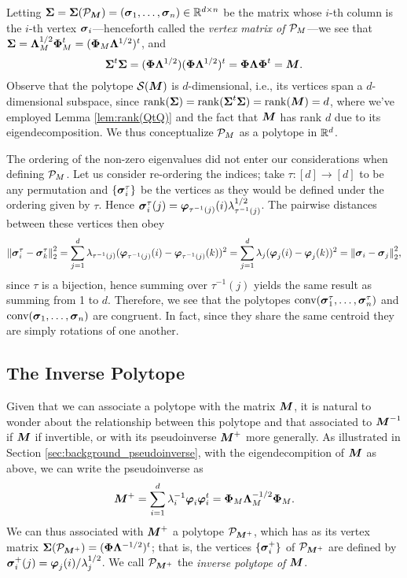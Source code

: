 Letting $\Sv=\Sv(\pol_\M)=(\sv_1,\dots,\sv_n)\in \R^{d\times n}$ be the matrix whose $i$-th column is the $i$-th vertex $\sv_i$---henceforth called the \emph{vertex matrix of $\P_M$}---we see that 
$ \Sv=\Eval_M^{1/2}\Eig_M^\tp=(\Eig_M\Eval^{1/2})^\tp$, and 
\begin{equation*}
    \Sv^\tp \Sv=(\Eig\Eval^{1/2}) (\Eig\Eval^{1/2})^\tp = \Eig \Eval\Eig^\tp =\M.
\end{equation*}
Observe that the polytope $\splx(\M)$ is $d$-dimensional, i.e., its vertices span a $d$-dimensional subspace, since
$\rank(\Sv)=\rank(\Sv^\tp \Sv)=\rank(\M)=d$, 
where we've employed Lemma \ref{lem:rank(QtQ)} and the fact that $\M$ has rank $d$ due to its eigendecomposition. We thus conceptualize $\P_M$ as a polytope in $\R^d$. 

\begin{remark}
	The ordering of the non-zero eigenvalues did not enter our considerations when defining $\P_M$. Let us consider re-ordering the indices; take $\tau:[d]\to[d]$ to be any permutation and $\{\sv_i^\tau\}$ be the vertices as they would be defined under the ordering given by $\tau$. Hence $\sv_i^\tau(j) = \vp_{\tau^{-1}(j)}(i)\lambda_{\tau^{-1}(j)}^{1/2}$. The pairwise distances between these vertices then obey 
	\begin{equation*}
	\norm{\sv_i^\tau-\sv_k^\tau}_2^2 = \sum_{j=1}^d \lambda_{\tau^{-1}(j)} (\vp_{\tau^{-1}(j)}(i)-\vp_{\tau^{-1}(j)}(k))^2 = \sum_{j=1}^d \lambda_{j} (\vp_{j}(i)-\vp_{j}(k))^2 = \norm{\sv_i-\sv_j}_2^2,
	\end{equation*}
	since $\tau$ is a bijection, hence summing over $\tau^{-1}(j)$ yields the same result as summing from 1 to $d$. 
	Therefore, we see that the polytopes $\conv(\sv_1^\tau,\dots,\sv_n^\tau)$ and  $\conv(\sv_1,\dots,\sv_n)$ are congruent. In fact, since they share the same centroid they are simply rotations of one another. 
\end{remark}


\subsection{The Inverse Polytope} 
\label{sec:inverse_polytope}
Given that we can associate a polytope with the matrix $\M$, it is natural to wonder about the relationship between this polytope and that associated to $\M^{-1}$ if $\M$ if invertible, or with its pseudoinverse $\M^+$ more generally. As illustrated in Section \ref{sec:background_pseudoinverse}, with the eigendecompition of $\M$ as above, we can write  the pseudoinverse as 
\[\M^+=\sum_{i=1}^d \lambda_i^{-1} \eig_i\eig_i^\tp = \Eig_M \Eval_M^{-1/2}\Eig_M.\]
We can thus associated with $\M^+$ a polytope $\pol_{\M^+}$, which has as its vertex matrix $\Sv(\pol_{\M^+})=(\Eig\Eval^{-1/2})^\tp$; that is, the vertices $\{\sv_i^+\}$ of $\pol_{\M^+}$ are defined by 
$\sv_i^+(j)=\eig_j(i)/\lambda_j^{1/2}$. We call $\pol_{\M^+}$ the \emph{inverse polytope of $\M$}. 

